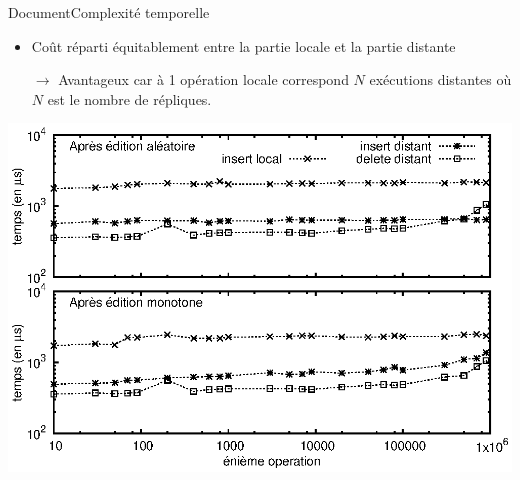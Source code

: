 \begin{frame}{Document}{Complexité temporelle}

  \begin{center}
    
  \end{center}
  
  \vspace{0.5cm}\hspace{-1cm}  
  \begin{minipage}{0.51\textwidth}
    \begin{itemize}
    \item Coût réparti équitablement entre la partie locale et la partie distante
    \item [$\rightarrow$] Avantageux car à 1 opération locale correspond $N$
      exécutions distantes où $N$ est le nombre de répliques.
    \end{itemize}    
  \end{minipage}
  \hfill
  \begin{minipage}{0.48\textwidth}
    \includegraphics[width=1.2\textwidth]{img/replication/time.eps}
  \end{minipage}

  
\end{frame}



